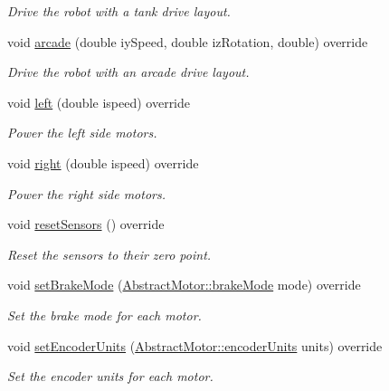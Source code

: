 \begin{DoxyCompactItemize}
\begin{DoxyCompactList}\small\item\em Drive the robot with a tank drive layout. \end{DoxyCompactList}\item 
void \mbox{\hyperlink{classokapi_1_1MockChassisModel_a1f9e4fcb2a9d1d9c178e93c843363335}{arcade}} (double iy\+Speed, double iz\+Rotation, double) override
\begin{DoxyCompactList}\small\item\em Drive the robot with an arcade drive layout. \end{DoxyCompactList}\item 
void \mbox{\hyperlink{classokapi_1_1MockChassisModel_a829d2392f492d3336ac786f09b27702c}{left}} (double ispeed) override
\begin{DoxyCompactList}\small\item\em Power the left side motors. \end{DoxyCompactList}\item 
void \mbox{\hyperlink{classokapi_1_1MockChassisModel_af9c3d9fb7c4390fb73f6853c5fbbbb32}{right}} (double ispeed) override
\begin{DoxyCompactList}\small\item\em Power the right side motors. \end{DoxyCompactList}\item 
void \mbox{\hyperlink{classokapi_1_1MockChassisModel_a5f0d81938cd6c5ceffa4606836cb010b}{reset\+Sensors}} () override
\begin{DoxyCompactList}\small\item\em Reset the sensors to their zero point. \end{DoxyCompactList}\item 
void \mbox{\hyperlink{classokapi_1_1MockChassisModel_abf406acab7b574f508fd50596bb4f97c}{set\+Brake\+Mode}} (\mbox{\hyperlink{classokapi_1_1AbstractMotor_a132e0485dbb59a60c3f934338d8fa601}{Abstract\+Motor\+::brake\+Mode}} mode) override
\begin{DoxyCompactList}\small\item\em Set the brake mode for each motor. \end{DoxyCompactList}\item 
void \mbox{\hyperlink{classokapi_1_1MockChassisModel_abd9e92455539815d2b855a1bcc64cf6c}{set\+Encoder\+Units}} (\mbox{\hyperlink{classokapi_1_1AbstractMotor_ae811cd825099f2defadeb1b7f7e7764c}{Abstract\+Motor\+::encoder\+Units}} units) override
\begin{DoxyCompactList}\small\item\em Set the encoder units for each motor. \end{DoxyCompactList}\item 

\end{DoxyCompactItemize}
